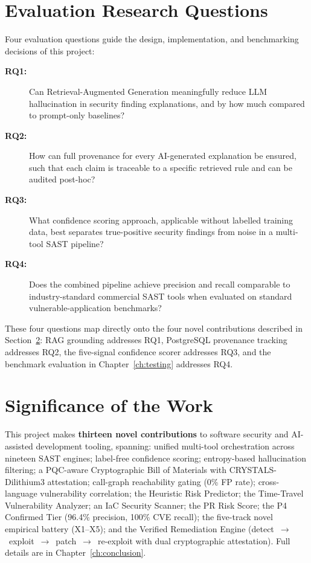 \section{Evaluation Research Questions}
\label{sec:rqs}

Four evaluation questions guide the design, implementation, and benchmarking decisions of this project:

\begin{description}
  \item[\textbf{RQ1:}] Can Retrieval-Augmented Generation meaningfully reduce LLM hallucination in security finding explanations, and by how much compared to prompt-only baselines?

  \item[\textbf{RQ2:}] How can full provenance for every AI-generated explanation be ensured, such that each claim is traceable to a specific retrieved rule and can be audited post-hoc?

  \item[\textbf{RQ3:}] What confidence scoring approach, applicable without labelled training data, best separates true-positive security findings from noise in a multi-tool SAST pipeline?

  \item[\textbf{RQ4:}] Does the combined \ACRQA{} pipeline achieve precision and recall comparable to industry-standard commercial SAST tools when evaluated on standard vulnerable-application benchmarks?
\end{description}

These four questions map directly onto the four novel contributions described in Section~\ref{sec:significance}: RAG grounding addresses RQ1, PostgreSQL provenance tracking addresses RQ2, the five-signal confidence scorer addresses RQ3, and the benchmark evaluation in Chapter~\ref{ch:testing} addresses RQ4.

\section{Significance of the Work}
\label{sec:significance}

This project makes \textbf{thirteen novel contributions} to software security and AI-assisted development tooling, spanning: unified multi-tool orchestration across nineteen SAST engines; label-free confidence scoring; entropy-based hallucination filtering; a PQC-aware Cryptographic Bill of Materials with CRYSTALS-Dilithium3 attestation; call-graph reachability gating (0\% FP rate); cross-language vulnerability correlation; the Heuristic Risk Predictor; the Time-Travel Vulnerability Analyzer; an IaC Security Scanner; the PR Risk Score; the P4 Confirmed Tier (96.4\% precision, 100\% CVE recall); the five-track novel empirical battery (X1--X5); and the Verified Remediation Engine (detect~$\to$~exploit~$\to$~patch~$\to$~re-exploit with dual cryptographic attestation). Full details are in Chapter~\ref{ch:conclusion}.

